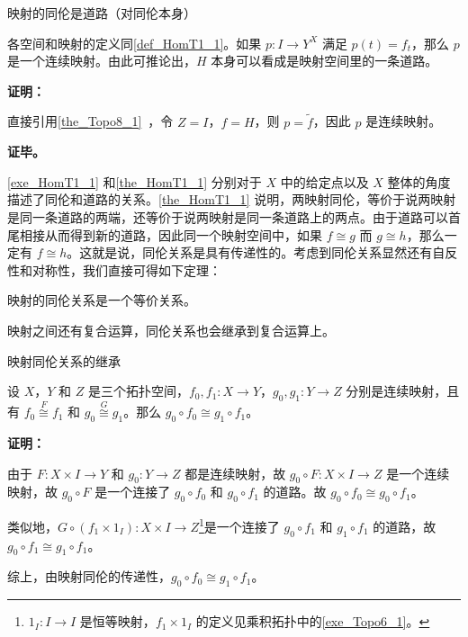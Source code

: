 \begin{theorem}{映射的同伦是道路（对同伦本身）}\label{the_HomT1_1}

各空间和映射的定义同\autoref{def_HomT1_1}。如果 $p:I\rightarrow Y^X$ 满足 $p(t)=f_t$，那么 $p$ 是一个连续映射。由此可推论出，$H$ 本身可以看成是映射空间里的一条道路。

\end{theorem}

\textbf{证明：}

直接引用\autoref{the_Topo8_1}~，令 $Z=I$，$f=H$，则 $p=\widetilde{f}$，因此 $p$ 是连续映射。

\textbf{证毕。}

\autoref{exe_HomT1_1} 和\autoref{the_HomT1_1} 分别对于 $X$ 中的给定点以及 $X$ 整体的角度描述了同伦和道路的关系。\autoref{the_HomT1_1} 说明，两映射同伦，等价于说两映射是同一条道路的两端，还等价于说两映射是同一条道路上的两点。由于道路可以首尾相接从而得到新的道路，因此同一个映射空间中，如果 $f\cong g$ 而 $g\cong h$，那么一定有 $f\cong h$。这就是说，同伦关系是具有传递性的。考虑到同伦关系显然还有自反性和对称性，我们直接可得如下定理：

\begin{theorem}{}
映射的同伦关系是一个等价关系。
\end{theorem}

映射之间还有复合运算，同伦关系也会继承到复合运算上。

\begin{theorem}{映射同伦关系的继承}\label{the_HomT1_2}

设 $X$，$Y$ 和 $Z$ 是三个拓扑空间，$f_0, f_1:X\rightarrow Y$，$g_0, g_1:Y\rightarrow Z$ 分别是连续映射，且有 $f_0\overset{F}{\cong}f_1$ 和 $g_0\overset{G}{\cong}g_1$。那么 $g_0\circ f_0\cong g_1\circ f_1$。

\end{theorem}

\textbf{证明：}

由于 $F:X\times I\rightarrow Y$ 和 $g_0:Y\rightarrow Z$ 都是连续映射，故 $g_0\circ F:X\times I\rightarrow Z$ 是一个连续映射，故 $g_0\circ F$ 是一个连接了 $g_0\circ f_0$ 和 $g_0\circ f_1$ 的道路。故 $g_0\circ f_0\cong g_0\circ f_1$。

类似地，$G \circ (f_1 \times 1_I): X \times I \rightarrow Z$\footnote{$1_I:I\rightarrow I$ 是恒等映射，$f_1 \times 1_I$ 的定义见乘积拓扑中的\autoref{exe_Topo6_1}。}是一个连接了 $g_0 \circ f_1$ 和 $g_1\circ f_1$ 的道路，故 $g_0 \circ f_1\cong g_1 \circ f_1$。

综上，由映射同伦的传递性，$g_0 \circ f_0\cong g_1 \circ f_1$。

